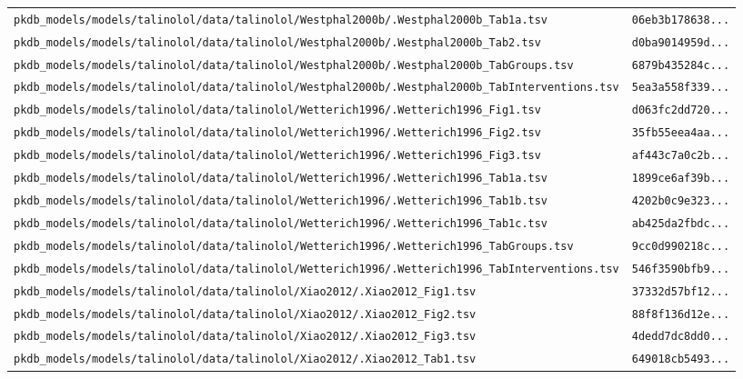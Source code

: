 \documentclass{article}
\begin{document}
\begin{longtable}{ll}
\texttt{pkdb\_models/models/talinolol/data/talinolol/Westphal2000b/.Westphal2000b\_Tab1a.tsv} & \texttt{06eb3b178638...} \\
\texttt{pkdb\_models/models/talinolol/data/talinolol/Westphal2000b/.Westphal2000b\_Tab2.tsv} & \texttt{d0ba9014959d...} \\
\texttt{pkdb\_models/models/talinolol/data/talinolol/Westphal2000b/.Westphal2000b\_TabGroups.tsv} & \texttt{6879b435284c...} \\
\texttt{pkdb\_models/models/talinolol/data/talinolol/Westphal2000b/.Westphal2000b\_TabInterventions.tsv} & \texttt{5ea3a558f339...} \\
\texttt{pkdb\_models/models/talinolol/data/talinolol/Wetterich1996/.Wetterich1996\_Fig1.tsv} & \texttt{d063fc2dd720...} \\
\texttt{pkdb\_models/models/talinolol/data/talinolol/Wetterich1996/.Wetterich1996\_Fig2.tsv} & \texttt{35fb55eea4aa...} \\
\texttt{pkdb\_models/models/talinolol/data/talinolol/Wetterich1996/.Wetterich1996\_Fig3.tsv} & \texttt{af443c7a0c2b...} \\
\texttt{pkdb\_models/models/talinolol/data/talinolol/Wetterich1996/.Wetterich1996\_Tab1a.tsv} & \texttt{1899ce6af39b...} \\
\texttt{pkdb\_models/models/talinolol/data/talinolol/Wetterich1996/.Wetterich1996\_Tab1b.tsv} & \texttt{4202b0c9e323...} \\
\texttt{pkdb\_models/models/talinolol/data/talinolol/Wetterich1996/.Wetterich1996\_Tab1c.tsv} & \texttt{ab425da2fbdc...} \\
\texttt{pkdb\_models/models/talinolol/data/talinolol/Wetterich1996/.Wetterich1996\_TabGroups.tsv} & \texttt{9cc0d990218c...} \\
\texttt{pkdb\_models/models/talinolol/data/talinolol/Wetterich1996/.Wetterich1996\_TabInterventions.tsv} & \texttt{546f3590bfb9...} \\
\texttt{pkdb\_models/models/talinolol/data/talinolol/Xiao2012/.Xiao2012\_Fig1.tsv} & \texttt{37332d57bf12...} \\
\texttt{pkdb\_models/models/talinolol/data/talinolol/Xiao2012/.Xiao2012\_Fig2.tsv} & \texttt{88f8f136d12e...} \\
\texttt{pkdb\_models/models/talinolol/data/talinolol/Xiao2012/.Xiao2012\_Fig3.tsv} & \texttt{4dedd7dc8dd0...} \\
\texttt{pkdb\_models/models/talinolol/data/talinolol/Xiao2012/.Xiao2012\_Tab1.tsv} & \texttt{649018cb5493...} \\

\end{longtable}
\end{document}
